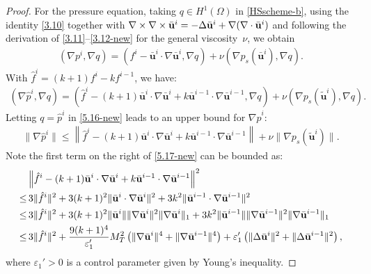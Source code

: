 \documentclass{article}
\theoremstyle{definition}                   %
\begin{document}
\begin{proof}
%
For the pressure equation, taking $q\in H^1(\Omega)$ in
\eqref{HSscheme-b}, using the identity \eqref{3.10} together with
$\nabla\times\nabla\times\bar{\bf u}^i = -\Delta\bar{\bf u}^i + \nabla(\nabla\cdot\bar{\bf u}^i)$
and following the derivation of \eqref{3.11}--\eqref{3.12-new} for the
general viscosity~$\nu$, we obtain
\begin{align}
(\nabla p^i, \nabla q) = (f^i - \bar{\mathbf{u}}^i \cdot \nabla\bar{\mathbf{u}}^i, \nabla q) + \nu (\nabla p_s(\bar{\mathbf{u}}^i), \nabla q).
\label{5.15-new}
\end{align}
%
With $\hat{f}^i = (k+1)f^i - kf^{i-1}$, we have:
\begin{align}
(\nabla \hat{p}^i, \nabla q) = \left(\hat{f}^i - (k+1)\bar{\mathbf{u}}^i \cdot \nabla\bar{\mathbf{u}}^i + k\bar{\mathbf{u}}^{i-1} \cdot \nabla\bar{\mathbf{u}}^{i-1}, \nabla q\right) + \nu (\nabla p_s(\tilde{\mathbf{u}}^i), \nabla q).
\label{5.16-new}
\end{align}
% 
Letting $q=\hat{p}^i$ in \eqref{5.16-new} leads to an upper bound for $\nabla \hat{p}^i$:
\begin{align}
\|\nabla \hat{p}^i\| \leq \left\| \hat{f}^i - (k+1)\bar{\mathbf{u}}^i \cdot \nabla\bar{\mathbf{u}}^i + k\bar{\mathbf{u}}^{i-1} \cdot \nabla\bar{\mathbf{u}}^{i-1} \right\| + \nu \|\nabla p_s(\tilde{\mathbf{u}}^i)\|.
\label{5.17-new}
\end{align}
Note the first term on the right of \eqref{5.17-new} can be bounded as:
\begin{align}
&\left\| \hat{f}^i - (k+1)\bar{\mathbf{u}}^i \cdot \nabla\bar{\mathbf{u}}^i + k\bar{\mathbf{u}}^{i-1} \cdot \nabla\bar{\mathbf{u}}^{i-1} \right\|^2\notag\\
\leq &\, 3\|\hat{f}^i\|^2 + 3(k+1)^2 \|\bar{\mathbf{u}}^i \cdot \nabla\bar{\mathbf{u}}^i\|^2 + 3k^2 \|\bar{\mathbf{u}}^{i-1} \cdot \nabla\bar{\mathbf{u}}^{i-1}\|^2 \notag \\
\leq &\, 3\|\hat{f}^i\|^2 + 3(k+1)^2 \|\bar{\mathbf{u}}^i\| \|\nabla\bar{\mathbf{u}}^i\|^2 \|\nabla\bar{\mathbf{u}}^i\|_1 + 3k^2 \|\bar{\mathbf{u}}^{i-1}\| \|\nabla\bar{\mathbf{u}}^{i-1}\|^2 \|\nabla\bar{\mathbf{u}}^{i-1}\|_1 \notag \\
\leq &\, 3\|\hat{f}^i\|^2 
+ \frac{9(k+1)^4}{\varepsilon_1'} M_T^2 \left(\|\nabla\bar{\mathbf{u}}^i\|^4 + \|\nabla\bar{\mathbf{u}}^{i-1}\|^4\right)
+ \varepsilon_1' \left(\|\Delta\bar{\mathbf{u}}^i\|^2 + \|\Delta\bar{\mathbf{u}}^{i-1}\|^2\right), 
\label{5.18-new}
\end{align}
where 
$\varepsilon_1'>0$ is a control parameter given by  Young's inequality. 

\end{proof}
\end{document}
